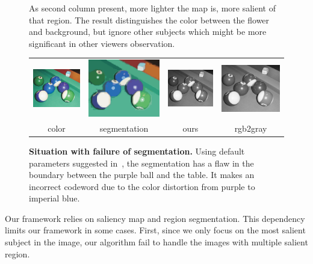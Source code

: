 {\begin{figure}[t]
\begin{center}
{As second column present, more lighter the map is, more salient of that region.
The result distinguishes the color between the flower and background, but ignore
other subjects which might be more significant in other viewers observation.
}
\label{fig:collect}
\end{center}
\end{figure}
%
\begin{figure}[t]
\begin{center}
\begin{tabular}{cccc}
\includegraphics[width=0.2\linewidth]{fig/c04.png} &
\includegraphics[width=0.2\linewidth]{fig/c04-seg.png} &
\includegraphics[width=0.2\linewidth]{fig/c04-sparse_dr.png} &
\includegraphics[width=0.2\linewidth]{fig/c04-rgb2gray.png} \\
color & segmentation & ours & rgb2gray
%
\end{tabular}
\caption{
\textbf{Situation with failure of segmentation.}
Using default parameters suggested in~\protect\cite{Felzenszwalb:2004:EGI},
the segmentation has a flaw in the boundary between the purple ball and the table.
It makes an incorrect codeword due to the color distortion from purple to imperial blue.
}
\label{fig:segmentation}
\end{center}
\end{figure}
%
Our framework relies on saliency map and region segmentation.
This dependency limits our framework in some cases.
First, since we only focus on the most salient subject in the image, 
our algorithm fail to handle the images with multiple salient region.
}
